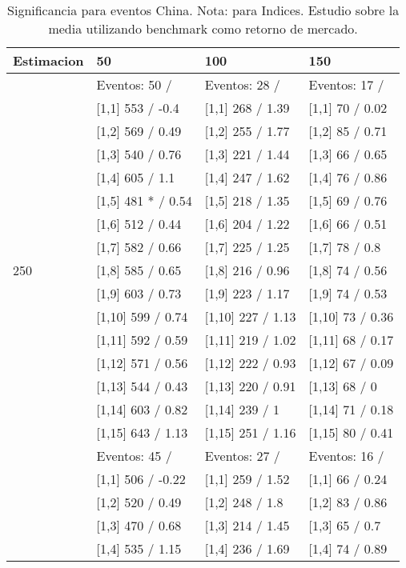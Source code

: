 \begin{table}

\caption{Significancia para eventos China. Nota: para Indices. Estudio sobre la media utilizando benchmark como retorno de mercado.}
\centering
\begin{tabular}[t]{llll}
\toprule
Estimacion & 50 & 100 & 150\\
\midrule
 & Eventos:  50 / & Eventos:  28 / & Eventos:  17 /\\
 & {}[1,1] 553  / -0.4 & {}[1,1] 268  / 1.39 & {}[1,1] 70  / 0.02\\
 & {}[1,2] 569  / 0.49 & {}[1,2] 255  / 1.77 & {}[1,2] 85  / 0.71\\
 & {}[1,3] 540  / 0.76 & {}[1,3] 221  / 1.44 & {}[1,3] 66  / 0.65\\
 & {}[1,4] 605  / 1.1 & {}[1,4] 247  / 1.62 & {}[1,4] 76  / 0.86\\
\addlinespace
 & {}[1,5] 481 * / 0.54 & {}[1,5] 218  / 1.35 & {}[1,5] 69  / 0.76\\
 & {}[1,6] 512  / 0.44 & {}[1,6] 204  / 1.22 & {}[1,6] 66  / 0.51\\
 & {}[1,7] 582  / 0.66 & {}[1,7] 225  / 1.25 & {}[1,7] 78  / 0.8\\
250 & {}[1,8] 585  / 0.65 & {}[1,8] 216  / 0.96 & {}[1,8] 74  / 0.56\\
 & {}[1,9] 603  / 0.73 & {}[1,9] 223  / 1.17 & {}[1,9] 74  / 0.53\\
\addlinespace
 & {}[1,10] 599  / 0.74 & {}[1,10] 227  / 1.13 & {}[1,10] 73  / 0.36\\
 & {}[1,11] 592  / 0.59 & {}[1,11] 219  / 1.02 & {}[1,11] 68  / 0.17\\
 & {}[1,12] 571  / 0.56 & {}[1,12] 222  / 0.93 & {}[1,12] 67  / 0.09\\
 & {}[1,13] 544  / 0.43 & {}[1,13] 220  / 0.91 & {}[1,13] 68  / 0\\
 & {}[1,14] 603  / 0.82 & {}[1,14] 239  / 1 & {}[1,14] 71  / 0.18\\
\addlinespace
 & {}[1,15] 643  / 1.13 & {}[1,15] 251  / 1.16 & {}[1,15] 80  / 0.41\\
 & Eventos:  45 / & Eventos:  27 / & Eventos:  16 /\\
 & {}[1,1] 506  / -0.22 & {}[1,1] 259  / 1.52 & {}[1,1] 66  / 0.24\\
 & {}[1,2] 520  / 0.49 & {}[1,2] 248  / 1.8 & {}[1,2] 83  / 0.86\\
 & {}[1,3] 470  / 0.68 & {}[1,3] 214  / 1.45 & {}[1,3] 65  / 0.7\\
\addlinespace
 & {}[1,4] 535  / 1.15 & {}[1,4] 236  / 1.69 & {}[1,4] 74  / 0.89\\

\end{tabular}
\end{table}
